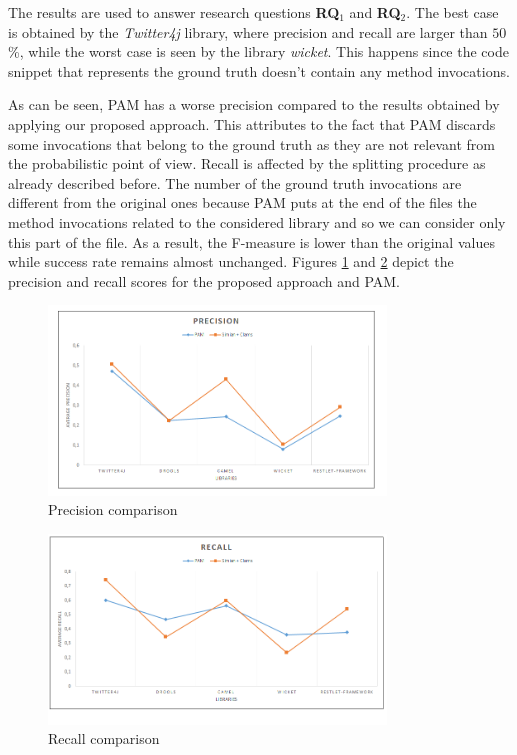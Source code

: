 The results are used to answer research questions \textbf{RQ$_1$} and \textbf{RQ$_2$}. The best case is obtained by the \emph{Twitter4j} library, where precision and recall are larger than $50$\%, while the worst case is seen by the library \emph{wicket}. This happens since the code snippet that represents the ground truth doesn't contain any method invocations. %

As can be seen, PAM has a worse precision compared to the results obtained by applying our proposed approach. This attributes to the fact that PAM discards some invocations that belong to the ground truth as they are not relevant from the probabilistic point of view. Recall is affected by the splitting procedure as already described before. The number of the ground truth invocations are different from the original ones because PAM puts at the end of the files the method invocations related to the considered library and so we can consider only this part of the file. As a result, the F-measure is lower than the original values while success rate remains almost unchanged. Figures \ref{fig:Precision} and \ref{fig:Recall} depict the precision and recall scores for the proposed approach and PAM.%

\begin{figure}[!h]
\includegraphics[width=0.80\textwidth]{images/Precision.png}
\centering
  \caption{Precision comparison}
  \label{fig:Precision}
\end{figure}


\begin{figure}[!h]
\includegraphics[width=0.80\textwidth]{images/Recall.png}
\centering
\caption{Recall comparison}
\label{fig:Recall}
\end{figure}


